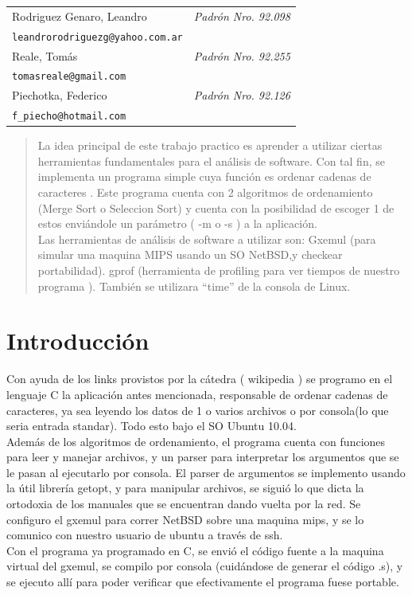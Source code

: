 \begin{flushleft}
{\renewcommand{\arraystretch}{2.5}
\renewcommand{\tabcolsep}{1.2cm}
\begin{tabular}{ l l }
  Rodriguez Genaro, Leandro & \textit{Padrón Nro. 92.098} \\
  \texttt{leandrorodriguezg@yahoo.com.ar} \\
  \hline
  Reale, Tomás & \textit{Padrón Nro. 92.255} \\
  \texttt{tomasreale@gmail.com} \\
  \hline
  Piechotka, Federico & \textit{Padrón Nro. 92.126} \\
  \texttt{f\_piecho@hotmail.com} \\
  \hline
\end{tabular}}
\end{flushleft}


\thispagestyle{empty}
\newpage
\tableofcontents
\newpage

\begin{abstract}
La idea principal de este trabajo practico es aprender a utilizar ciertas herramientas fundamentales
para el análisis de software. Con tal fin, se implementa un programa simple cuya función es ordenar	
cadenas de caracteres . Este programa cuenta con 2 algoritmos de ordenamiento 
(Merge Sort o Seleccion Sort) y cuenta con la posibilidad de escoger 1 de estos enviándole un parámetro ( -m o -s ) a la aplicación.
\\Las herramientas de análisis de software a utilizar son:   
Gxemul (para simular una maquina MIPS usando un SO NetBSD,y checkear portabilidad).
gprof (herramienta de profiling para ver tiempos de nuestro programa ).
También se utilizara “time” de la consola de Linux.
\end{abstract}

\section{Introducción}
Con ayuda de los links provistos por la cátedra ( wikipedia ) se programo en el lenguaje C la aplicación antes mencionada, responsable de ordenar cadenas de caracteres, ya sea leyendo los datos de 1 o varios archivos o por consola(lo que seria entrada standar). 
Todo esto bajo el SO Ubuntu 10.04.
\\Además de los algoritmos de ordenamiento, el programa cuenta con funciones para leer y manejar archivos, y un parser para interpretar los argumentos que se le pasan al ejecutarlo por consola.
El parser de argumentos se implemento usando la útil librería getopt, y para manipular archivos, se siguió lo que dicta la ortodoxia de los manuales que se encuentran dando vuelta por la red.
Se configuro el gxemul para correr NetBSD sobre una maquina mips, y se lo comunico con nuestro usuario de ubuntu a través de ssh.
\\Con el programa ya programado en C, se envió el código fuente a la maquina virtual del gxemul, se compilo por consola (cuidándose de generar el código .s), y se ejecuto allí para poder verificar que efectivamente el programa fuese portable.


